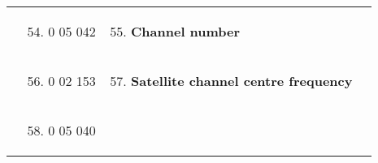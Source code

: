 \begin{longtable}[]{@{}llll@{}}
\begin{minipage}[t]{0.22\columnwidth}\raggedright
\strut
\end{minipage} & \begin{minipage}[t]{0.22\columnwidth}\raggedright
\begin{enumerate}
\setcounter{enumi}{53}
\item
  0 05 042
\end{enumerate}\strut
\end{minipage} & \begin{minipage}[t]{0.22\columnwidth}\raggedright
\begin{enumerate}
\setcounter{enumi}{54}
\item
  \textbf{Channel number}
\end{enumerate}\strut
\end{minipage} & \begin{minipage}[t]{0.22\columnwidth}\raggedright
\strut
\end{minipage}\tabularnewline
\begin{minipage}[t]{0.22\columnwidth}\raggedright
\strut
\end{minipage} & \begin{minipage}[t]{0.22\columnwidth}\raggedright
\begin{enumerate}
\setcounter{enumi}{55}
\item
  0 02 153
\end{enumerate}\strut
\end{minipage} & \begin{minipage}[t]{0.22\columnwidth}\raggedright
\begin{enumerate}
\setcounter{enumi}{56}
\item
  \textbf{Satellite channel centre frequency}
\end{enumerate}\strut
\end{minipage} & \begin{minipage}[t]{0.22\columnwidth}\raggedright
\strut
\end{minipage}\tabularnewline
\begin{minipage}[t]{0.22\columnwidth}\raggedright
\strut
\end{minipage} & \begin{minipage}[t]{0.22\columnwidth}\raggedright
\begin{enumerate}
\setcounter{enumi}{57}
\item
  0 05 040
\end{enumerate}\strut
\end{minipage} & \begin{minipage}[t]{0.22\columnwidth}\raggedright

\end{minipage}
\end{longtable}
